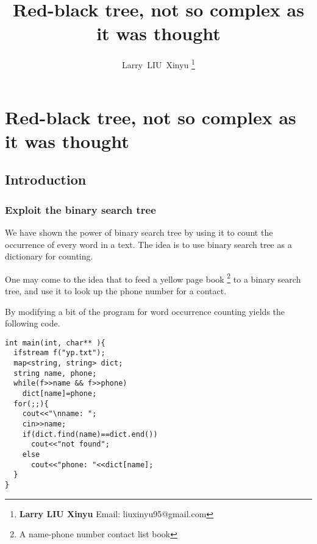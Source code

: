 \documentclass{article}
\begin{document}


\title{Red-black tree, not so complex as it was thought}

\author{Larry~LIU~Xinyu
\thanks{{\bfseries Larry LIU Xinyu } \newline
  Email: liuxinyu95@gmail.com \newline}
  }

\maketitle
\fi


\ifx\wholebook\relax
\chapter{Red-black tree, not so complex as it was thought}
\fi

\section{Introduction}
\label{introduction} 

\subsection{Exploit the binary search tree}
We have shown the power of binary search tree by using it to count
the occurrence of every word in a text. The idea is to use binary
search tree as a dictionary for counting.

One may come to the idea that to feed a yellow page book
\footnote{A name-phone number contact list book} to a binary
search tree, and use it to look up the phone number for a contact.

By modifying a bit of the program for word occurrence counting
yields the following code.

\begin{lstlisting}
int main(int, char** ){
  ifstream f("yp.txt");
  map<string, string> dict;
  string name, phone;
  while(f>>name && f>>phone)
    dict[name]=phone;
  for(;;){
    cout<<"\nname: ";
    cin>>name;
    if(dict.find(name)==dict.end())
      cout<<"not found";
    else
      cout<<"phone: "<<dict[name];
  }
}
\end{lstlisting}
\end{document}
